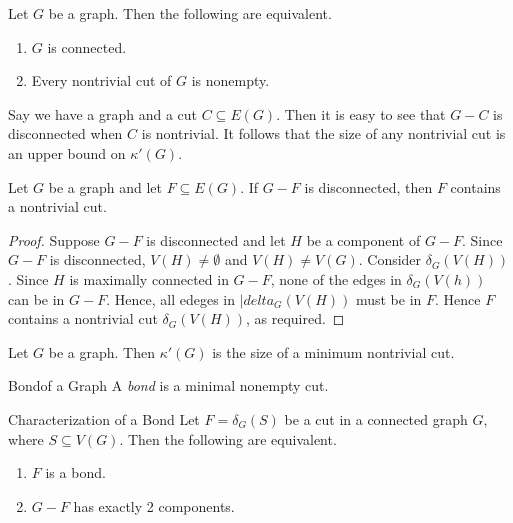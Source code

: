 \documentclass[co342]{subfiles}
\begin{document}
    \begin{prop}{}
        Let $G$ be a graph. Then the following are equivalent.
        \begin{enumerate}
            \item $G$ is connected.
            \item Every nontrivial cut of $G$ is nonempty.
        \end{enumerate}
    \end{prop}

    \np Say we have a graph and a cut $C\subseteq E\left( G \right)$. Then it is easy to see that $G-C$ is disconnected when $C$ is nontrivial. It follows that the size of any nontrivial cut is an upper bound on $\kappa'\left( G \right) $.

    \begin{prop}{}
        Let $G$ be a graph and let $F\subseteq E\left( G \right)$. If $G-F$ is disconnected, then $F$ contains a nontrivial cut.
    \end{prop}

    \begin{proof}
        Suppose $G-F$ is disconnected and let $H$ be a component of $G-F$. Since $G-F$ is disconnected, $V\left( H \right) \neq\emptyset$ and $V\left( H \right) \neq V\left( G \right) $. Consider $\delta_G\left( V\left( H \right)  \right)$. Since $H$ is maximally connected in $G-F$, none of the edges in $\delta_G\left( V\left( h \right)  \right)$ can be in $G-F$. Hence, all edeges in $|delta_G\left( V\left( H \right)  \right)$ must be in $F$. Hence $F$ contains a nontrivial cut $\delta_G\left( V\left( H \right) \right)$, as required.
    \end{proof}

    \begin{cor}{}
        Let $G$ be a graph. Then $\kappa'\left( G \right)$ is the size of a minimum nontrivial cut.
    \end{cor}	

    \begin{definition}{Bond}{of a Graph}
        A \emph{bond} is a minimal nonempty cut.
    \end{definition}

    \begin{prop}{Characterization of a Bond}
        Let $F=\delta_G\left( S \right)$ be a cut in a connected graph $G$, where $S\subseteq V\left( G \right)$. Then the following are equivalent.
        \begin{enumerate}
            \item $F$ is a bond.
            \item $G-F$ has exactly 2 components.
        \end{enumerate}
    \end{prop}
\end{document}
